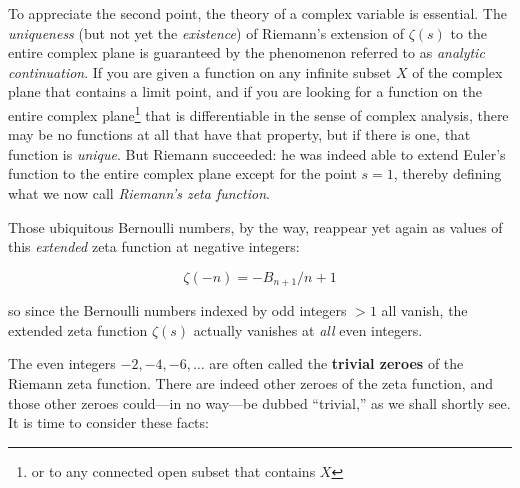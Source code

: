 \documentclass[openany]{book}
\theoremstyle{plain}
\theoremstyle{definition}
\begin{document}
To appreciate the second point, the theory of a complex variable is
essential. The {\it uniqueness} (but not yet the {\it existence}) of
Riemann's extension of $\zeta(s)$ to the entire complex plane is
guaranteed by the phenomenon referred to as {\it analytic
  continuation}.  If you are given a function on any infinite subset
$X$ of the complex plane that contains a limit point, and if you are
looking for a function on the entire complex plane{\footnote{ or to
    any connected open subset that contains $X$}} that is
differentiable in the sense of complex analysis, there may be no
functions at all that have that property, but if there is one, that
function is {\it unique}.  But Riemann succeeded: he was indeed able
to extend Euler's function to the entire complex plane except for the
point $s=1$, thereby defining what we now call {\it Riemann's zeta
  function}.  \vskip20pt
 
 Those ubiquitous Bernoulli numbers, by the way, reappear yet again as
 values of this {\it extended} zeta function at negative integers:
  
  $$\zeta(-n) = -B_{n+1}/n+1$$ 
  
  so since the Bernoulli numbers indexed by odd integers $>1$ all
  vanish, the extended zeta function $\zeta(s)$ actually vanishes at
  {\it all} even integers.
  
  The even integers $-2, -4, -6, \dots$ are often called the {\bf
    trivial zeroes} of the Riemann zeta function.  There are indeed
  other zeroes of the zeta function, and those other zeroes could---in no way---be
  dubbed ``trivial,'' as we shall shortly see.\vskip20pt It is time to
  consider these facts:
  
\end{document}
